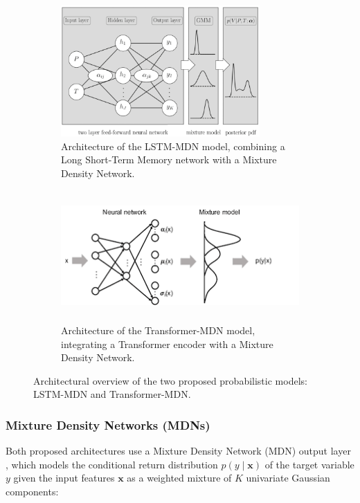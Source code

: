 \begin{figure}[H]
    \centering
    \begin{subfigure}[b]{0.49\textwidth}
        \centering
        \includegraphics[width=\linewidth, height=5cm]{Images/Methods/model_architecture_LSTM_MDN.png}
        \caption{Architecture of the LSTM-MDN model, combining a Long Short-Term Memory network with a Mixture Density Network.}
        \label{fig:model_architecture_LSTM_MDN}
    \end{subfigure}
    \hfill
    \begin{subfigure}[b]{0.49\textwidth}
        \centering
        \includegraphics[width=\linewidth, height=5cm]{Images/Methods/model_architecture_Transformer_MDN.png}
        \caption{Architecture of the Transformer-MDN model, integrating a Transformer encoder with a Mixture Density Network.}
        \label{fig:model_architecture_Transformer_MDN}
    \end{subfigure}

    \caption{Architectural overview of the two proposed probabilistic models: LSTM-MDN and Transformer-MDN.}
    \label{fig:model_architectures}
\end{figure}

\subsubsection{Mixture Density Networks (MDNs)} 
\label{sec:mixture_density_networks}
Both proposed architectures use a Mixture Density Network (MDN) output layer \parencite{bishop1994mdn}, which models the conditional return distribution $p(y \mid \textbf{x})$ of the target variable $y$ given the input features $\textbf{x}$ as a weighted mixture of $K$ univariate Gaussian components:

